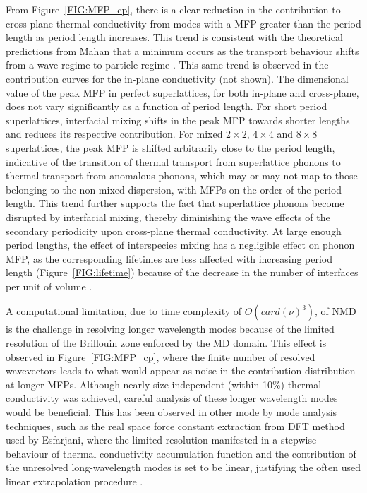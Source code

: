 \documentclass[aps,prb,preprint,preprintnumbers,amsmath,amssymb,floatfix,superscriptaddress]{revtex4}
\begin{document}
From Figure~\ref{FIG:MFP_cp}, there is a clear reduction in the contribution to cross-plane thermal conductivity from modes with a MFP greater than the period length as period length increases. This trend is consistent with the theoretical predictions from Mahan that a minimum occurs as the transport behaviour shifts from a wave-regime to particle-regime \cite{PhysRevLett.84.927,PhysRevB.56.10754}. This same trend is observed in the contribution curves for the in-plane conductivity (not shown). The dimensional value of the peak MFP in perfect superlattices, for both in-plane and cross-plane, does not vary significantly as a function of period length. For short period superlattices, interfacial mixing shifts in the peak MFP towards shorter lengths and reduces its respective contribution. For mixed $2\times2$, $4\times4$ and $8\times8$ superlattices, the peak MFP is shifted arbitrarily close to the period length, indicative of the transition of thermal transport from superlattice phonons to thermal transport from anomalous phonons, which may or may not map to those belonging to the non-mixed dispersion, with MFPs on the order of the period length. This trend further supports the fact that superlattice phonons become disrupted by interfacial mixing, thereby diminishing the wave effects of the secondary periodicity upon cross-plane thermal conductivity. At large enough period lengths, the effect of interspecies mixing has a negligible effect on phonon MFP, as the corresponding lifetimes are less affected with increasing period length (Figure~\ref{FIG:lifetime}) because of the decrease in the number of interfaces per unit of volume \cite{PhysRevB.79.075316}.

A computational limitation, due to time complexity of $O(card(\nu)^3)$, of NMD is the challenge in resolving longer wavelength modes because of the limited resolution of the Brillouin zone enforced by the MD domain. This effect is observed in Figure~\ref{FIG:MFP_cp}, where the finite number of resolved wavevectors leads to what would appear as noise in the contribution distribution at longer MFPs. Although nearly size-independent (within 10\%) thermal conductivity was achieved, careful analysis of these longer wavelength modes would be beneficial. This has been observed in other mode by mode analysis techniques, such as the real space force constant extraction from DFT method used by Esfarjani, where the limited resolution manifested in a stepwise behaviour of thermal conductivity accumulation function and the contribution of the unresolved long-wavelength modes is set to be linear, justifying the often used linear extrapolation procedure \cite{PhysRevB.84.085204}.
\end{document}
